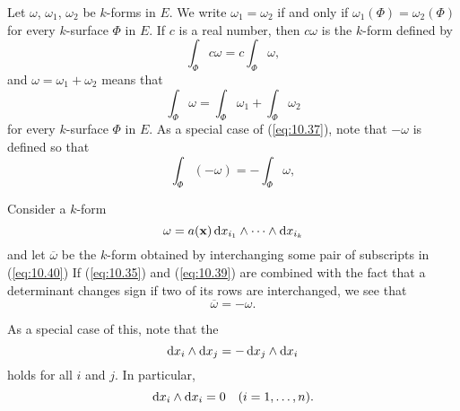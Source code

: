\begin{mydef}
    \label{mydef:10.13}
    Let $\omega$, $\omega_1$, $\omega_2$ be $k$-forms in $E$.
    We write $\omega_1 = \omega_2$
    if and only if $\omega_1(\Phi) = \omega_2(\Phi)$
    for every $k$-surface $\Phi$ in $E$.
    If $c$ is a real number,
    then $c\omega$ is the $k$-form defined by
    \begin{equation}
        \label{eq:10.37}
        \int_{\Phi} c\omega =
        c\int_{\Phi} \omega ,
    \end{equation}
    and $\omega = \omega_1 + \omega_2$ means that
    \begin{equation}
        \label{eq:10.38}
        \int_{\Phi} \omega =
        \int_{\Phi} \omega_1 +
        \int_{\Phi} \omega_2
    \end{equation}
    for every $k$-surface $\Phi$ in $E$.
    As a special case of (\ref{eq:10.37}),
    note that $-\omega$ is defined so that
    \begin{equation}
        \label{eq:10.39}
        \int_{\Phi} (-\omega) =
        -\int_{\Phi} \omega ,
    \end{equation}

    Consider a $k$-form
    \begin{equation}
        \label{eq:10.40}
        \omega = a(\mathbf{x})
        \d x_{i_1}
        \wedge \cdots \wedge
        \d x_{i_k}
    \end{equation}
    and let $\overline{\omega}$ be the $k$-form obtained by interchanging some pair of subscripts in (\ref{eq:10.40})
    If (\ref{eq:10.35}) and (\ref{eq:10.39}) are combined with the fact that a determinant changes sign if two of its rows are interchanged,
    we see that
    \begin{equation}
        \label{eq:10.41}
        \overline{\omega} = -\omega.
    \end{equation}

    As a special case of this, note that the 
    \begin{equation}
        \label{eq:10.42}
        \d x_i \wedge \d x_j =
        -\d x_j \wedge \d x_i
    \end{equation}
    holds for all $i$ and $j$.
    In particular,
    \begin{equation}
        \label{eq:10.43}
        \d x_i \wedge \d x_i = 0
        \quad (i = 1, \dots, n).
    \end{equation}


\end{mydef}
